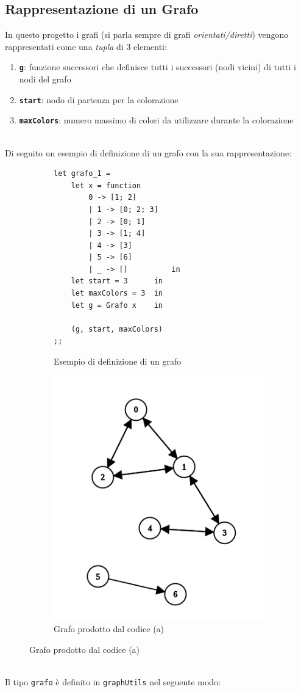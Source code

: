 \subsection{Rappresentazione di un Grafo}
In questo progetto i grafi (si parla sempre di grafi \textit{orientati/diretti}) vengono rappresentati come una \textit{tupla} di 3 elementi:

\begin{enumerate}
	\item \textbf{\lstinline[style=cmd]|g|}: funzione successori che definisce tutti i successori (nodi vicini) di tutti i nodi del grafo
	\item \textbf{\lstinline[style=cmd]|start|}: nodo di partenza per la colorazione
	\item \textbf{\lstinline[style=cmd]|maxColors|}: numero massimo di colori da utilizzare durante la colorazione
\end{enumerate}
\ \\
Di seguito un esempio di definizione di un grafo con la sua rappresentazione: 
\begin{figure}[H]
	\begin{subfigure}[b]{.5\textwidth}
\begin{lstlisting}[style=caml]
let grafo_1 =
	let x = function 
		0 -> [1; 2]
		| 1 -> [0; 2; 3]
		| 2 -> [0; 1]
		| 3 -> [1; 4]
		| 4 -> [3]
		| 5 -> [6]
		| _ -> [] 		   in
	let start = 3 	   in
	let maxColors = 3  in
	let g = Grafo x    in
	
	(g, start, maxColors)
;;
\end{lstlisting}
\caption{Esempio di definizione di un grafo}
	\end{subfigure}%
	\begin{subfigure}[b]{.5\textwidth}
			\centering
			\includegraphics[width=.8\linewidth]{img/grafoesempio1.png}
			\caption{Grafo prodotto dal codice (a)}
	\end{subfigure}%
\end{figure}
\ \\
Il tipo \lstinline[style=cmd]|grafo| è definito in \lstinline[style=cmd]|graphUtils| nel seguente modo:

